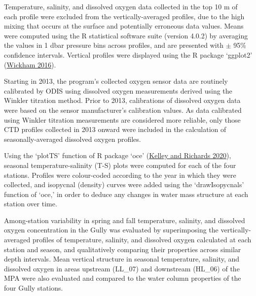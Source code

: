\documentclass[12pt]{article}\usepackage[]{graphicx}\usepackage[]{color}
\begin{document}
Temperature, salinity, and dissolved oxygen data collected in the top 10 m of each profile were excluded from the vertically-averaged profiles, due to the high mixing that occurs at the surface and potentially erroneous data values. Means were computed using the R statistical software suite (version 4.0.2) by averaging the values in 1 dbar pressure bins across profiles, and are presented with \(\pm\) 95\% confidence intervals. Vertical profiles were displayed using the R package `ggplot2' (\protect\hyperlink{ref-wickham_2016}{Wickham 2016}).

Starting in 2013, the program's collected oxygen sensor data are routinely calibrated by ODIS using dissolved oxygen measurements derived using the Winkler titration method. Prior to 2013, calibrations of dissolved oxygen data were based on the sensor manufacturer's calibration values. As data calibrated using Winkler titration measurements are considered more reliable, only those CTD profiles collected in 2013 onward were included in the calculation of seasonally-averaged dissolved oxygen profiles.

Using the `plotTS' function of R package `oce' (\protect\hyperlink{ref-kelley_2020}{Kelley and Richards 2020}), seasonal temperature-salinity (T-S) plots were computed for each of the four stations. Profiles were colour-coded according to the year in which they were collected, and isopycnal (density) curves were added using the `drawIsopycnals' function of `oce,' in order to deduce any changes in water mass structure at each station over time.

Among-station variability in spring and fall temperature, salinity, and dissolved oxygen concentration in the Gully was evaluated by superimposing the vertically-averaged profiles of temperature, salinity, and dissolved oxygen calculated at each station and season, and qualitatively comparing their properties across similar depth intervals. Mean vertical structure in seasonal temperature, salinity, and dissolved oxygen in areas upstream (LL\_07) and downstream (HL\_06) of the MPA were also evaluated and compared to the water column properties of the four Gully stations.
\end{document}
